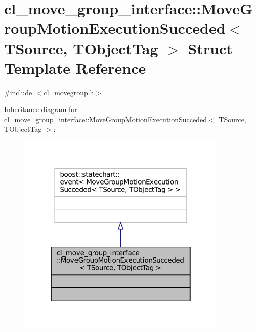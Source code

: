\hypertarget{structcl__move__group__interface_1_1MoveGroupMotionExecutionSucceded}{}\section{cl\+\_\+move\+\_\+group\+\_\+interface\+:\+:Move\+Group\+Motion\+Execution\+Succeded$<$ T\+Source, T\+Object\+Tag $>$ Struct Template Reference}
\label{structcl__move__group__interface_1_1MoveGroupMotionExecutionSucceded}


{\ttfamily \#include $<$cl\+\_\+movegroup.\+h$>$}



Inheritance diagram for cl\+\_\+move\+\_\+group\+\_\+interface\+:\+:Move\+Group\+Motion\+Execution\+Succeded$<$ T\+Source, T\+Object\+Tag $>$\+:
\nopagebreak
\begin{figure}[H]
\begin{center}
\leavevmode
\includegraphics[width=286pt]{structcl__move__group__interface_1_1MoveGroupMotionExecutionSucceded__inherit__graph}
\end{center}
\end{figure}


